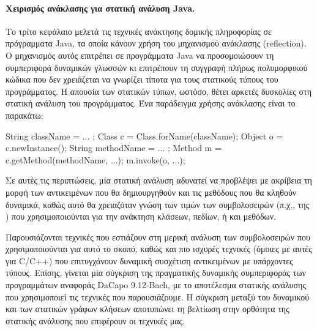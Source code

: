 \paragraph*{Χειρισμός ανάκλασης για στατική ανάλυση {\en Java}.}
Το τρίτο κεφάλαιο μελετά τις τεχνικές ανάκτησης δομικής πληροφορίας σε
πρόγραμματα {\en Java}, τα οποία κάνουν χρήση του μηχανισμού ανάκλασης
({\en reflection}).  Ο μηχανισμός αυτός επιτρέπει σε προγράμματα {\en
  Java} να προσομοιώσουν τη συμπεριφορά δυναμικών γλωσσών κι
επιτρέπουν τη συγγραφή πλήρως πολυμορφικού κώδικα που δεν χρειάζεται
να γνωρίζει τίποτα για τους στατικούς τύπους του προγράμματος. Η
απουσία των στατικών τύπων, ωστόσο, θέτει αρκετές δυσκολίες στη
στατική ανάλυση του προγράμματος. Ένα παράδειγμα χρήσης ανάκλασης
είναι το παρακάτω:
{\en
  \begin{javacodelinum}
    String className = ... ;
    Class c = Class.forName(className);
    Object o = c.newInstance();
    String methodName = ... ;
    Method m = c.getMethod(methodName, ...);
    m.invoke(o, ...);
  \end{javacodelinum}
}

Σε αυτές τις περιπτώσεις, μία στατική ανάλυση αδυνατεί να προβλέψει με
ακρίβεια τη μορφή των αντικειμένων που θα δημιουργηθούν και τις μεθόδους
που θα κληθούν δυναμικά, καθώς αυτό θα χρειαζόταν γνώση των τιμών των
συμβολοσειρών (π.χ., της {\en {}}) που χρησιμοποιούνται
για την ανάκτηση κλάσεων, πεδίων, ή και μεθόδων.

Παρουσιάζονται τεχνικές που εστιάζουν στη μερική ανάλυση των
συμβολοσειρών που χρησιμοποιούνται για αυτό το σκοπό, καθώς και πιο
ισχυρές τεχνικές (όμοιες με αυτές για {\en C/C++}) που επιτυγχάνουν
δυναμική συσχέτιση αντικειμένων με υπάρχοντες τύπους.
%
Επίσης, γίνεται μία σύγκριση της πραγματικής δυναμικής συμπεριφοράς
των προγραμμάτων αναφοράς {\en DaCapo 9.12-Bach}, με το αποτέλεσμα
στατικής ανάλυσης που χρησιμοποιεί τις τεχνικές που παρουσιάζουμε. Η
σύγκριση μεταξύ του δυναμικού και των στατικών γράφων κλήσεων
αποτυπώνει τη βελτίωση στην ορθότητα της στατικής ανάλυσης που
επιφέρουν οι τεχνικές μας.




